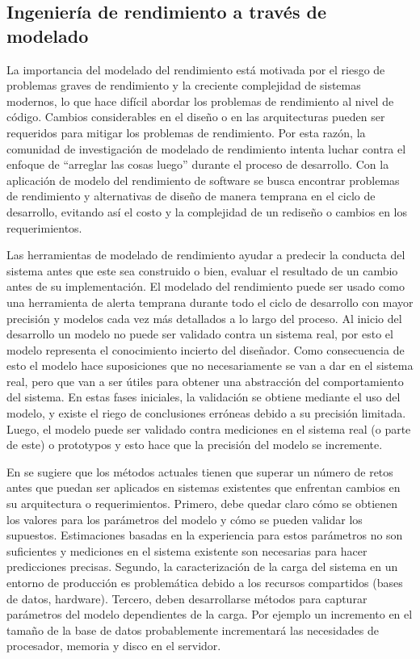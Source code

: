 \documentclass[11pt, twoside]{report}
\begin{document}
\subsection{Ingeniería de rendimiento a través de modelado} 
La importancia del modelado del rendimiento está motivada por el riesgo de problemas graves de rendimiento\cite{palladion-screencast} y la creciente complejidad de sistemas modernos, lo que hace difícil abordar los problemas de rendimiento al nivel de código. Cambios considerables en el diseño o en las arquitecturas pueden ser requeridos para mitigar los problemas de rendimiento. Por esta razón, la comunidad de investigación de modelado de rendimiento intenta luchar contra el enfoque de ``arreglar las cosas luego'' durante el proceso de desarrollo. Con la aplicación de modelo del rendimiento de software se busca encontrar problemas de rendimiento y alternativas de diseño de manera temprana en el ciclo de desarrollo, evitando así el costo y la complejidad de un rediseño o cambios en los requerimientos.

Las herramientas de modelado de rendimiento ayudar a predecir la conducta del sistema antes que este sea construido o bien, evaluar el resultado de un cambio antes de su implementación. El modelado del rendimiento puede ser usado como una herramienta de alerta temprana durante todo el ciclo de desarrollo con mayor precisión y modelos cada vez más detallados a lo largo del proceso. Al inicio del desarrollo un modelo no puede ser validado contra un sistema real, por esto el modelo representa el conocimiento incierto del diseñador. Como consecuencia de esto el modelo hace suposiciones que no necesariamente se van a dar en el sistema real, pero que van a ser útiles para obtener una abstracción del comportamiento del sistema. En estas fases iniciales, la validación se obtiene mediante el uso del modelo, y existe el riego de conclusiones erróneas debido a su precisión limitada. Luego, el modelo puede ser validado contra mediciones en el sistema real (o parte de este) o prototypos y esto hace que la precisión del modelo se incremente.

En \cite{jit-et-al} se sugiere que los métodos actuales tienen que superar un número de retos antes que puedan ser aplicados en sistemas existentes que enfrentan cambios en su arquitectura o requerimientos. Primero, debe quedar claro cómo se obtienen los valores para los parámetros del modelo y cómo se pueden validar los supuestos. Estimaciones basadas en la experiencia para estos parámetros no son suficientes y mediciones en el sistema existente son necesarias para hacer predicciones precisas. Segundo, la caracterización de la carga del sistema en un entorno de producción es problemática debido a los recursos compartidos (bases de datos, hardware). Tercero, deben desarrollarse métodos para capturar parámetros del modelo dependientes de la carga. Por ejemplo un incremento en el tamaño de la base de datos probablemente incrementará las necesidades de procesador, memoria y disco en el servidor.
\end{document}
